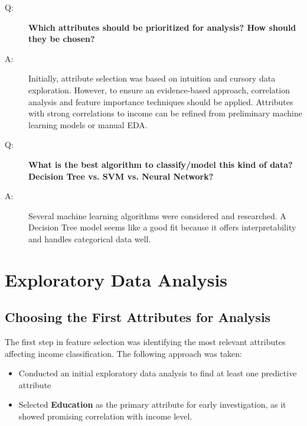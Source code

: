 \documentclass[journal]{IEEEtran}
\begin{document}
\begin{description}
    \item[Q:] \textbf{Which attributes should be prioritized for analysis? How should they be chosen?}
    \item[A:] Initially, attribute selection was based on intuition and cursory data exploration. However, to ensure an evidence-based approach, correlation analysis and feature importance techniques should be applied. Attributes with strong correlations to income can be refined from preliminary machine learning models or manual EDA.

    \item[Q:] \textbf{What is the best algorithm to classify/model this kind of data? Decision Tree vs. SVM vs. Neural Network?}
    \item[A:] Several machine learning algorithms were considered and researched. A Decision Tree model seems like a good fit because it offers interpretability and handles categorical data well.

\end{description}

\section{Exploratory Data Analysis}

\subsection{Choosing the First Attributes for Analysis}
The first step in feature selection was identifying the most relevant attributes affecting income classification. The following approach was taken:
\begin{itemize}
    \item Conducted an initial exploratory data analysis to find at least one predictive attribute
    \item Selected \textbf{Education} as the primary attribute for early investigation, as it showed promising correlation with income level.
\end{itemize}
\end{document}
